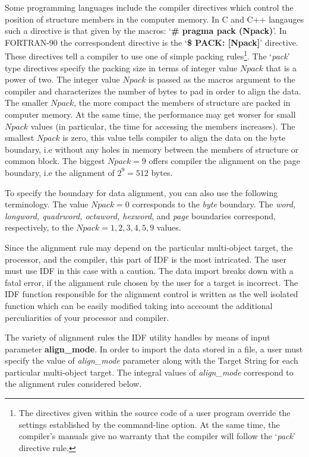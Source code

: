 Some programming languages include the compiler directives
which control the position of structure members
in the computer memory.
In C and C++ langauges such a directive is
that given by the macros: `{\bf \# pragma pack (Npack)}'.
In FORTRAN-90 the correspondent directive is the 
`{\bf \$ PACK: [Npack]}' directive.
These directives tell a compiler to use one of 
simple packing rules\footnote{
The directives given within the source code of a user program
override the settings established by the command-line option.
At the same time, the compiler's manuals give no warranty 
that the compiler will follow the `{\it pack}' directive rule.}. 
The `{\it pack}' type directives specify the packing size
in terms of integer value $Npack$ that is a power of two.
The integer value $Npack$ is passed as the macros argument
to the compiler and characterizes the number of bytes to pad
in order to align the data.  
The smaller $Npack$, the more compact the members of structure
are packed in computer memory.
At the same time, the performance may get worser for small $Npack$ values
(in particular, the time for accessing the members increases).
The smallest $Npack$ is zero, this value tells compiler
to align the data on the byte boundary, i.e without any holes in memory
between the members of structure or common block. The biggest $Npack=9$
offers compiler the alignment on the page boundary, 
i.e the alignment of $2^9=512$ bytes.

To specify the boundary for data alignment, you can also use
the following terminology.
The value $Npack=0$ corresponds to the {\it byte} boundary.
The {\it word, longword, quadrword, octaword, hexword}, and {\it page}
boundaries correspond, respectively, to the $Npack=1,2,3,4,5,9$ values.

Since the alignment rule may depend on the particular multi-object target,
the processor, and the compiler, 
this part of IDF is the most intricated.
The user must use IDF in this case with a caution.
The data import breaks down with a fatal error,
if the alignment rule chosen by the user for a target is incorrect.
The IDF function responsible for the alignment control 
is written as the well isolated function
which can be easily modified taking into acccount
the additional perculiarities of your processor and compiler.

The variety of alignment rules the IDF utility handles by
means of input parameter {\bf align\_mode}. 
In order to import the data stored in a file,
a user must specify the value of {\it align\_mode} parameter 
along with the Target String
for each particular multi-object target.
The integral values of {\it align\_mode} correspond to the alignment rules 
considered below. 

